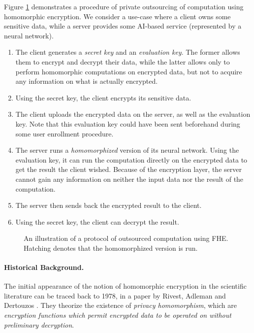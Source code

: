 Figure \ref{fig:classical_usage_fhe} demonstrates a procedure of private outsourcing of computation using homomorphic encryption. We consider a use-case where a client owns some sensitive data, while a server provides some AI-based service (represented by a neural network).

\begin{enumerate}
	\item The client generates a \textit{secret key} and an \textit{evaluation key}. The former allows them to encrypt and decrypt their data, while the latter allows only to perform homomorphic computations on encrypted data, but not to acquire any information on what is actually encrypted.
	\item Using the secret key, the client encrypts its sensitive data.
	\item The client uploads the encrypted data on the server, as well as the evaluation key. Note that this evaluation key could have been sent beforehand during some user enrollment procedure.
	\item The server runs a \textit{homomorphized} version of its neural network. Using the evaluation key, it can run the computation directly on the encrypted data to get the result the client wished. Because of the encryption layer, the server cannot gain any information on neither the input data nor the result of the computation.
	\item The server then sends back the encrypted result to the client.
	\item Using the secret key, the client can decrypt the result.
\end{enumerate}


\begin{figure}
	\centering
	
	\caption{An illustration of a protocol of outsourced computation using \gls{FHE}. Hatching denotes that the homomorphized version is run.}
	\label{fig:classical_usage_fhe}
\end{figure}


\paragraph{Historical Background.}

The initial appearance of the notion of homomorphic encryption in the scientific literature can be traced back to 1978, in a paper by Rivest, Adleman and Dertouzos \cite{RAD78}. They theorize the existence of \textit{privacy homomorphism}, which are \textit{encryption functions which permit encrypted data to be operated on without preliminary decryption}.

